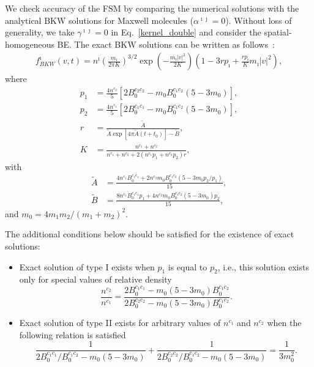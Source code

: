 We check accuracy of the FSM by comparing the numerical solutions with the analytical BKW solutions for Maxwell molecules ($\alpha^{\imath\jmath}=0$). Without loss of generality, we take $\gamma^{\imath\jmath}=0$ in Eq.~\eqref{kernel_double} and consider the spatial-homogeneous BE. The exact BKW solutions can be written as follows~\cite{BKW2}:
\begin{equation}\label{bkw}
\begin{split}
  f_{BKW}^{\imath}(v,t)=n^{\imath}
    \left(\frac{m_\imath}{2\pi{K}}\right)^{3/2}\exp\left(-\frac{m_\imath|v|^2}{2K}\right)\left(1-3rp_\imath+\frac{rp_\imath}{K}m_\imath|v|^2\right),
\end{split}
\end{equation}
where
\begin{equation}
\begin{aligned}
p_1&=\frac{4n^{c_2}}{5}[2B_0^{c_2c_2}-m_0{}B_0^{c_1c_2}(5-3m_0)],\\
  p_2&=\frac{4n^{c_1}}{5}[2B_0^{c_1c_1}-m_0B_0^{c_1c_2}(5-3m_0)], \\
    r&=\frac{\widetilde{A}}{\widetilde{A}\exp[4\pi{}\widetilde{A}(t+t_0)]-\widetilde{B}},\\
    K&=\frac{n^{c_1}+n^{c_2}}{n^{c_1}+n^{c_2}+2(n^{c_1}p_1+n^{c_2}p_2)r},
\end{aligned}
\end{equation}
with
\begin{equation}
\begin{aligned}
  \widetilde{A}&=\frac{4n^{c_1}B_0^{c_1c_1}+2n^{c_2}m_0B_0^{c_1c_2}(5-3m_0{p_2}/p_1)}{15},\\
\widetilde{B}&=\frac{8n^{c_1}B_0^{c_1c_1}p_1+4n^{c_2}m_0B_0^{c_1c_2}(5-3m_0)p_2}{15},
\end{aligned}
\end{equation}
and $m_0={4m_1m_2}/{(m_1+m_2)^2}$. 

The additional conditions below should be satisfied for the existence of exact solutions:
\begin{itemize}
    \item Exact solution of type I exists when $p_1$ is equal to $p_2$, i.e., this solution exists only for special values of relative density
    \begin{equation}
        \frac{n^{c_2}}{n^{c_1}}= \frac{2B_0^{c_1c_1}-m_0(5-3m_0)B_0^{c_1c_2}}        {2B_0^{c_2c_2}-m_0(5-3m_0)B_0^{c_1c_2}}.
    \end{equation}
    \item Exact solution of type II exists for arbitrary values of $n^{c_1}$ and $n^{c_2}$  when the following relation is satisfied
    \begin{equation}
        \frac{1}{2B_0^{c_1c_1}/B_0^{c_1c_2}-m_0(5-3m_0)}+\frac{1}{2B_0^{c_2c_2}/B_0^{c_1c_2}-m_0(5-3m_0)}=\frac{1}{3m_0^2}.
    \end{equation}
\end{itemize}


